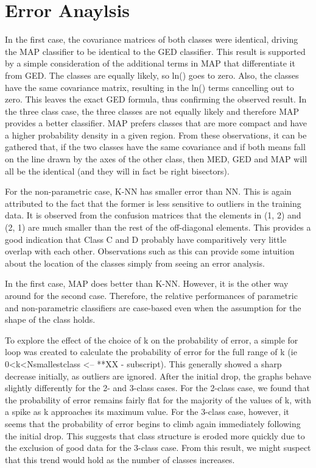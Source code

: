 \section{Error Anaylsis}

In the first case, the covariance matrices of both classes were identical,
driving the MAP classifier to be identical to the GED classifier.  This result
is supported by a simple consideration of the additional terms in MAP that 
differentiate it from GED.  The classes are equally likely, so ln(\Theta) goes
to zero.  Also, the classes have the same covariance matrix, resulting in the
ln(\Sigma) terms cancelling out to zero.  This leaves the exact GED formula, 
thus confirming the observed result.  In the three class case, the three
classes are not equally likely and therefore MAP provides a better classifier. 
MAP prefers classes that are more compact and have a higher probability density
in a given region. From these observations, it can be gathered that, if the two
classes have the same covariance and if both means fall on the line drawn by
the  axes of the other class, then MED, GED and MAP will all be the identical 
(and they will in fact be right bisectors).

For the non-parametric case, K-NN has smaller error than NN. This is again
attributed to the fact that the former is less sensitive to outliers in the 
training data. It is observed from the confusion matrices that the elements in
(1, 2) and (2, 1) are much smaller than the rest of the off-diagonal elements. 
This provides a good indication that Class C and D probably have comparitively 
very little overlap with each other.  Observations such as this can provide
some intuition about the location of the classes simply from seeing an error analysis.

In the first case, MAP does better than K-NN. However, it is the other way
around for the second case. Therefore, the relative performances of parametric 
and non-parametric classifiers are case-based even when the assumption for the 
shape of the class holds.

To explore the effect of the choice of k on the probability of error, a simple 
for loop was created to calculate the probability of error for the full range 
of k (ie 0<k<Nsmallestclass <-- **XX - subscript).  This generally showed a 
sharp decrease initially, as outliers are ignored.  After the initial drop, 
the graphs behave slightly differently for the 2- and 3-class cases.  For the 
2-class case, we found that the probability of error remains fairly flat for
the majority of the values of k, with a spike as k approaches its maximum
value. For the 3-class case, however, it seems that the probability of error 
begins to climb again immediately following the initial drop.  This suggests 
that class structure is eroded more quickly due to the exclusion of good data 
for the 3-class case.  From this result, we might suspect that this trend would
hold as the number of classes increases.
